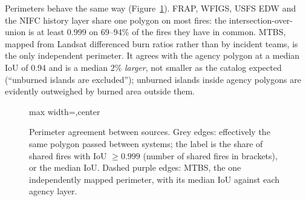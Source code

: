 \documentclass[11pt,a4paper]{article}
\newenvironment{fitfig}{\begin{adjustbox}{max width=\textwidth,center}}{\end{adjustbox}}
\begin{document}
Perimeters behave the same way (Figure~\ref{fig:perims}). FRAP, WFIGS, USFS EDW and the NIFC history layer
share one polygon on most fires: the intersection-over-union is at least 0.999 on 69--94\% of the fires they
have in common. MTBS, mapped from Landsat differenced burn ratios rather than by incident teams, is the only
independent perimeter. It agrees with the agency polygon at a median IoU of 0.94 and is a median 2\%
\emph{larger}, not smaller as the catalog expected (``unburned islands are excluded''); unburned islands
inside agency polygons are evidently outweighed by burned area outside them.

\begin{figure}[h]
\begin{fitfig}
\end{fitfig}
\caption{Perimeter agreement between sources. Grey edges: effectively the same polygon passed between systems;
the label is the share of shared fires with IoU $\ge 0.999$ (number of shared fires in brackets), or the median
IoU. Dashed purple edges: MTBS, the one independently mapped perimeter, with its median IoU against each agency
layer.}
\label{fig:perims}
\end{figure}
\end{document}
